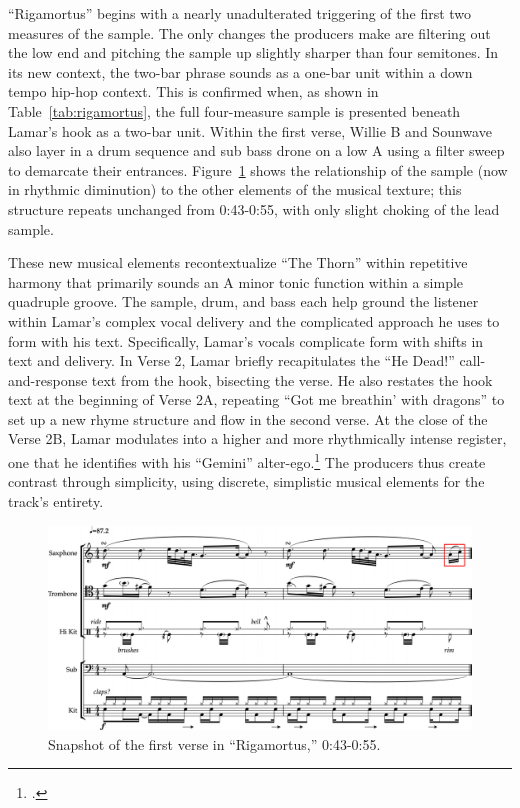 ``Rigamortus'' begins with a nearly unadulterated triggering of the first two measures of the sample. The only changes the producers make are filtering out the low end and pitching the sample up slightly sharper than four semitones. In its new context, the two-bar phrase sounds as a one-bar unit within a down tempo hip-hop context. This is confirmed when, as shown in Table~\ref{tab:rigamortus}, the full four-measure sample is presented beneath Lamar's hook as a two-bar unit. Within the first verse, Willie B and Sounwave also layer in a drum sequence and sub bass drone on a low A using a filter sweep to demarcate their entrances. Figure~\ref{fig:rigamortusnoslip} shows the relationship of the sample (now in rhythmic diminution) to the other elements of the musical texture; this structure repeats unchanged from 0:43-0:55, with only slight choking of the lead sample.

These new musical elements recontextualize ``The Thorn'' within repetitive harmony that primarily sounds an A minor tonic function within a simple quadruple groove. The sample, drum, and bass each help ground the listener within Lamar's complex vocal delivery and the complicated approach he uses to form with his text. Specifically, Lamar's vocals complicate form with shifts in text and delivery. In Verse 2, Lamar briefly recapitulates the ``He Dead!'' call-and-response text from the hook, bisecting the verse. He also restates the hook text at the beginning of Verse 2A, repeating ``Got me breathin' with dragons'' to set up a new rhyme structure and flow in the second verse. At the close of the Verse 2B, Lamar modulates into a higher and more rhythmically intense register, one that he identifies with his ``Gemini'' alter-ego.\footnote{\cite{chrismenchTrackingManyVoices2017}.} The producers thus create contrast through simplicity, using discrete, simplistic musical elements for the track's entirety.

\begin{figure}[ht]
    \centering
    \includegraphics[width=\textwidth]{images/figures/chp 02/043053rigamortusnoslip.pdf}
    \caption{Snapshot of the first verse in ``Rigamortus,'' 0:43-0:55.}
    \label{fig:rigamortusnoslip}
\end{figure}


